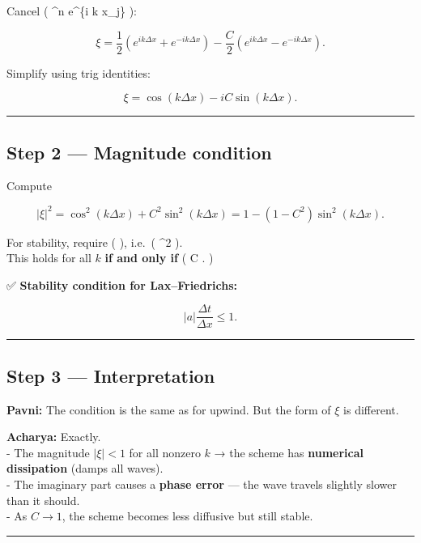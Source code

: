\documentclass[
  letterpaper,
]{book}
\begin{document}
Cancel ( \xi\^{}n e\^{}\{i k x\_j\} ):

\[
\xi = \frac{1}{2}(e^{i k \Delta x} + e^{-i k \Delta x}) - \frac{C}{2}(e^{i k \Delta x} - e^{-i k \Delta x}).
\]

Simplify using trig identities:

\[
\xi = \cos(k\Delta x) - i C \sin(k\Delta x).
\]

\begin{center}\rule{0.5\linewidth}{0.5pt}\end{center}

\subsection{Step 2 --- Magnitude
condition}\label{step-2-magnitude-condition}

Compute

\[
|\xi|^2 = \cos^2(k\Delta x) + C^2\sin^2(k\Delta x)
= 1 - (1 - C^2)\sin^2(k\Delta x).
\]

For stability, require ( \textbar{}\xi\textbar{}  ), i.e.~(
\textbar{}\xi\textbar\^{}2  ).\\
This holds for all \(k\) \textbf{if and only if} ( \textbar C\textbar{}
. )

✅ \textbf{Stability condition for Lax--Friedrichs:}

\[
\boxed{|a|\frac{\Delta t}{\Delta x} \le 1.}
\]

\begin{center}\rule{0.5\linewidth}{0.5pt}\end{center}

\subsection{Step 3 --- Interpretation}\label{step-3-interpretation}

\textbf{Pavni:} The condition is the same as for upwind. But the form of
\(\xi\) is different.

\textbf{Acharya:} Exactly.\\
- The magnitude \(|\xi| < 1\) for all nonzero \(k\) → the scheme has
\textbf{numerical dissipation} (damps all waves).\\
- The imaginary part causes a \textbf{phase error} --- the wave travels
slightly slower than it should.\\
- As \(C \to 1\), the scheme becomes less diffusive but still stable.

\begin{center}\rule{0.5\linewidth}{0.5pt}\end{center}
\end{document}
